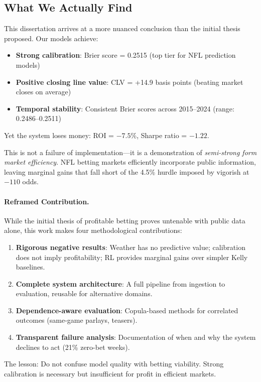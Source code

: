 \subsection{What We Actually Find}

This dissertation arrives at a more nuanced conclusion than the initial thesis proposed. Our models achieve:
\begin{itemize}
  \item \textbf{Strong calibration}: Brier score = 0.2515 (top tier for NFL prediction models)
  \item \textbf{Positive closing line value}: CLV = +14.9 basis points (beating market closes on average)
  \item \textbf{Temporal stability}: Consistent Brier scores across 2015--2024 (range: 0.2486--0.2511)
\end{itemize}

Yet the system loses money: ROI = $-7.5\%$, Sharpe ratio = $-1.22$.

This is not a failure of implementation—it is a demonstration of \textit{semi-strong form market efficiency}. NFL betting markets efficiently incorporate public information, leaving marginal gains that fall short of the 4.5\% hurdle imposed by vigorish at $-110$ odds.

\paragraph{Reframed Contribution.}
While the initial thesis of profitable betting proves untenable with public data alone, this work makes four methodological contributions:
\begin{enumerate}
  \item \textbf{Rigorous negative results}: Weather has no predictive value; calibration does not imply profitability; RL provides marginal gains over simpler Kelly baselines.
  \item \textbf{Complete system architecture}: A full pipeline from ingestion to evaluation, reusable for alternative domains.
  \item \textbf{Dependence-aware evaluation}: Copula-based methods for correlated outcomes (same-game parlays, teasers).
  \item \textbf{Transparent failure analysis}: Documentation of when and why the system declines to act (21\% zero-bet weeks).
\end{enumerate}

The lesson: Do not confuse model quality with betting viability. Strong calibration is necessary but insufficient for profit in efficient markets.

